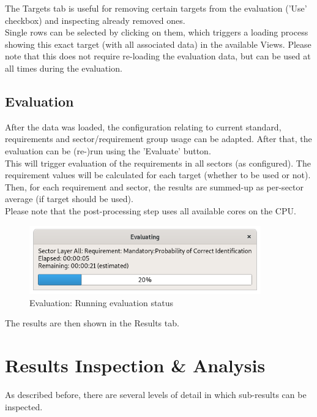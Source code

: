 The Targets tab is useful for removing certain targets from the evaluation ('Use' checkbox) and inspecting already removed ones. \\

Single rows can be selected by clicking on them, which triggers a loading process showing this exact target (with all associated data) in the available Views. Please note that this does not require re-loading the evaluation data, but can be used at all times during the evaluation. \\

\subsection{Evaluation}
\label{sec:eval_run_eval} 

After the data was loaded, the configuration relating to current standard, requirements and sector/requirement group usage can be adapted. After that, the evaluation can be (re-)run using the 'Evaluate' button. \\

This will trigger evaluation of the requirements in all sectors (as configured). The requirement values will be calculated for each target (whether to be used or not). Then, for each requirement and sector, the results are summed-up as per-sector average (if target should be used). \\

Please note that the post-processing step uses all available cores on the CPU.

\begin{figure}[H]
  \centering 
    \includegraphics[width=10cm]{../screenshots/eval_eval_status.png}
  \caption{Evaluation: Running evaluation status}
\end{figure}

The results are then shown in the Results tab.

\section{Results Inspection \& Analysis}
\label{sec:eval_inspect}

As described before, there are several levels of detail in which sub-results can be inspected.\\

